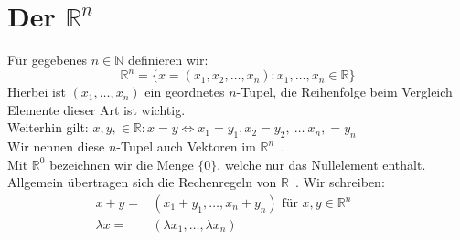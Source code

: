\documentclass{report}
\newcommand{\lb}{\lambda}
\newcommand{\R}{\mathbb{R}}
\newcommand{\N}{\mathbb{N}}
\newcommand{\mR}{$\mathbb{R}$\ }
\newcommand{\Rn}{\mathbb{R}^n\ }
\newcommand{\mRn}{$\mathbb{R}^n$\ }
\theoremstyle{customrem}
\theoremstyle{customdef}
\begin{document}
\section{Der $\R^n$}
	Für gegebenes $n \in \N$ definieren wir:\\
	$$\R^n = \{x = (x_1, x_2, \dots, x_n): x_1, \dots, x_n \in \R\}$$
	Hierbei ist $(x_1, \dots, x_n)$ ein geordnetes $n$-Tupel, die Reihenfolge beim Vergleich Elemente dieser Art ist wichtig.\\
	Weiterhin gilt: $x, y, \in \R : x = y \Leftrightarrow x_1 = y_1, x_2 = y_2,\ \dots \ x_n, = y_n$\\
	Wir nennen diese $n$-Tupel auch Vektoren im \mRn.\\
	Mit $\R^0$ bezeichnen wir die Menge $\{0\}$, welche nur das Nullelement enthält. Allgemein übertragen sich die Rechenregeln von \mR. Wir schreiben:
	\begin{align*}
		x + y =& (x_1 + y_1, \dots, x_n + y_n)\text{ für } x, y \in \Rn\qquad \tag*{Vektoraddition}\\
		\lb x = &(\lb x_1, \dots, \lb x_n)\qquad \tag*{Skalarmultiplikation}
	\end{align*}
\end{document}
